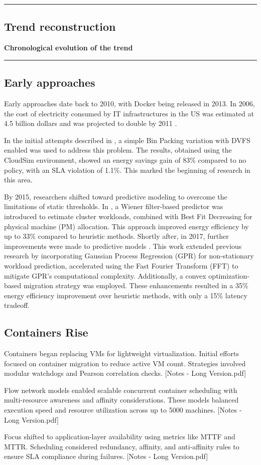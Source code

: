 {\color{gray}\hrule}
\begin{center}
\section{Trend reconstruction}
\textbf{Chronological evolution of the trend}
\bigskip
\end{center}
{\color{gray}\hrule}
\begin{multicols}{2}
\subsection{Early approaches}
Early approaches date back to 2010, with Docker being released in 2013. In 2006, the cost of electricity consumed by IT infrastructures in the US was estimated at 4.5 billion dollars and was projected to double by 2011 \cite{beloglazov_energy_2010}.

In the initial attempts described in \cite{beloglazov_energy_2010}, a simple Bin Packing variation with DVFS enabled was used to address this problem. The results, obtained using the CloudSim environment, showed an energy savings gain of 83\% compared to no policy, with an SLA violation of 1.1\%. This marked the beginning of research in this area.

By 2015, researchers shifted toward predictive modeling to overcome the limitations of static thresholds. In \cite{dabbagh_energy-efficient_2015}, a Wiener filter-based predictor was introduced to estimate cluster workloads, combined with Best Fit Decreasing for physical machine (PM) allocation. This approach improved energy efficiency by up to 33\% compared to heuristic methods.
Shortly after, in 2017, further improvements were made to predictive models \cite{bui_energy_2017}. This work extended previous research by incorporating Gaussian Process Regression (GPR) for non-stationary workload prediction, accelerated using the Fast Fourier Transform (FFT) to mitigate GPR's computational complexity. Additionally, a convex optimization-based migration strategy was employed. These enhancements resulted in a 35\% energy efficiency improvement over heuristic methods, with only a 15\% latency tradeoff.

\subsection{Containers Rise}
Containers began replacing VMs for lightweight virtualization. Initial efforts focused on container migration to reduce active VM count. Strategies involved modular watchdogs and Pearson correlation checks. [Notes - Long Version.pdf]

Flow network models enabled scalable concurrent container scheduling with multi-resource awareness and affinity considerations. These models balanced execution speed and resource utilization across up to 5000 machines. [Notes - Long Version.pdf]


Focus shifted to application-layer availability using metrics like MTTF and MTTR. Scheduling considered redundancy, affinity, and anti-affinity rules to ensure SLA compliance during failures. [Notes - Long Version.pdf]

\end{multicols}


